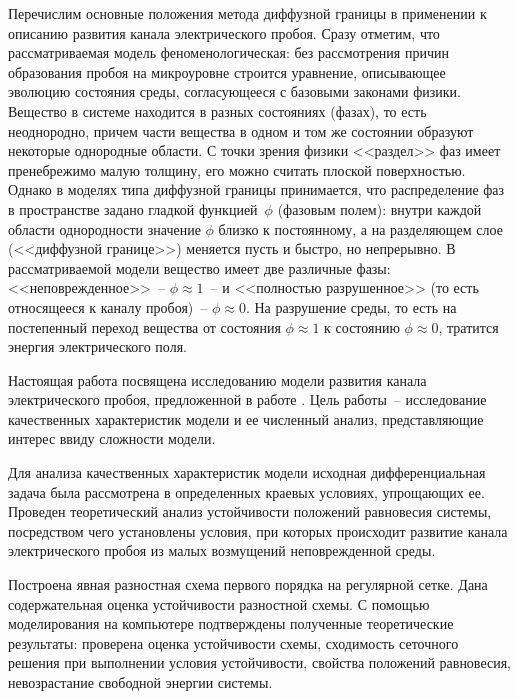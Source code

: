 Перечислим основные положения метода диффузной границы в применении к описанию развития канала электрического пробоя. Сразу отметим, что рассматриваемая модель феноменологическая: без рассмотрения причин образования пробоя на микроуровне строится уравнение, описывающее эволюцию состояния среды, согласующееся с базовыми законами физики. Вещество в системе находится в разных состояниях (фазах), то есть неоднородно, причем части вещества в одном и том же состоянии образуют некоторые однородные области. С точки зрения физики <<раздел>> фаз имеет пренебрежимо малую толщину, его можно считать плоской поверхностью. Однако в моделях типа диффузной границы принимается, что распределение фаз в пространстве задано гладкой функцией~$\phi$ (фазовым полем): внутри каждой области однородности значение $\phi$ близко к постоянному, а на разделяющем слое (<<диффузной границе>>) меняется пусть и быстро, но непрерывно. В рассматриваемой модели вещество имеет две различные фазы: <<неповрежденное>>~-- $\phi \approx 1$~-- и <<полностью разрушенное>> (то есть относящееся к каналу пробоя)~-- $\phi \approx 0$. На разрушение среды, то есть на постепенный переход вещества от состояния $\phi \approx 1$ к состоянию $\phi \approx 0$, тратится энергия электрического поля.

Настоящая работа посвящена исследованию модели развития канала электрического пробоя, предложенной в работе \cite{pitike_dielectric_breakdown}. Цель работы~-- исследование качественных характеристик модели и ее численный анализ, представляющие интерес ввиду сложности модели.

Для анализа качественных характеристик модели исходная дифференциальная задача была рассмотрена в определенных краевых условиях, упрощающих ее. Проведен теоретический анализ устойчивости положений равновесия системы, посредством чего установлены условия, при которых происходит развитие канала электрического пробоя из малых возмущений неповрежденной среды.

Построена явная разностная схема первого порядка на регулярной сетке. Дана содержательная оценка устойчивости разностной схемы. С помощью моделирования на компьютере подтверждены полученные теоретические результаты: проверена оценка устойчивости схемы, сходимость сеточного решения при выполнении условия устойчивости, свойства положений равновесия, невозрастание свободной энергии системы.